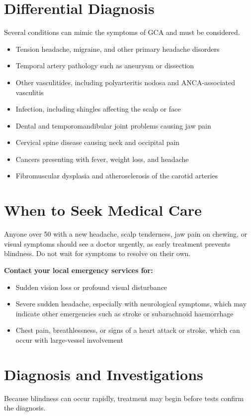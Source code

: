 \section*{Differential Diagnosis}
Several conditions can mimic the symptoms of GCA and must be considered.

\begin{itemize}
    \item Tension headache, migraine, and other primary headache disorders
    \item Temporal artery pathology such as aneurysm or dissection
    \item Other vasculitides, including polyarteritis nodosa and ANCA-associated vasculitis
    \item Infection, including shingles affecting the scalp or face
    \item Dental and temporomandibular joint problems causing jaw pain
    \item Cervical spine disease causing neck and occipital pain
    \item Cancers presenting with fever, weight loss, and headache
    \item Fibromuscular dysplasia and atherosclerosis of the carotid arteries
\end{itemize}

\section*{When to Seek Medical Care}
Anyone over 50 with a new headache, scalp tenderness, jaw pain on chewing, or visual symptoms should see a doctor urgently, as early treatment prevents blindness. Do not wait for symptoms to resolve on their own.

\textbf{Contact your local emergency services for:}
\begin{itemize}
    \item Sudden vision loss or profound visual disturbance
    \item Severe sudden headache, especially with neurological symptoms, which may indicate other emergencies such as stroke or subarachnoid haemorrhage
    \item Chest pain, breathlessness, or signs of a heart attack or stroke, which can occur with large-vessel involvement
\end{itemize}

\section*{Diagnosis and Investigations}
Because blindness can occur rapidly, treatment may begin before tests confirm the diagnosis.


